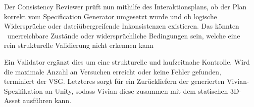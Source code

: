 Der Consistency Reviewer prüft nun mithilfe des Interaktionsplans, ob der Plan korrekt vom Specification Generator umgesetzt wurde und ob logische Widersprüche oder dateiübergreifende Inkonsistenzen existieren.
Das könnten \zB~unerreichbare Zustände oder widersprüchliche Bedingungen sein, welche eine rein strukturelle Validierung nicht erkennen kann

Ein Validator ergänzt dies um eine strukturelle und laufzeitnahe Kontrolle.
Wird die maximale Anzahl an Versuchen erreicht oder keine Fehler gefunden, terminiert der VSG.
Letzteres sorgt für ein Zurückliefern der generierten Vivian-Spezifikation an Unity, sodass Vivian diese zusammen mit dem statischen 3D-Asset ausführen kann.








